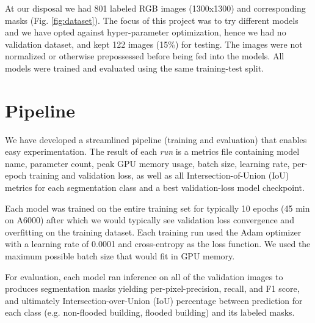 \documentclass[10pt,twocolumn,letterpaper]{article}
\begin{document}
At our disposal we had 801 labeled RGB images (1300x1300) and corresponding masks (Fig. \ref{fig:dataset}). The focus of this project was to try different models and we have opted against hyper-parameter optimization, hence we had no validation dataset, and kept 122 images (15\%) for testing. The images were not normalized or otherwise prepossessed before being fed into the models. All models were trained and evaluated using the same training-test split.



\section{Pipeline}

We have developed a streamlined pipeline (training and evaluation) that enables easy experimentation. The result of each \textit{run} is a metrics file containing model name, parameter count, peak GPU memory usage, batch size, learning rate, per-epoch training and validation loss, as well as all Intersection-of-Union (IoU) metrics for each segmentation class and a best validation-loss model checkpoint.

Each model was trained on the entire training set for typically 10 epochs (45 min on A6000) after which we would typically see validation loss convergence and overfitting on the training dataset. Each training run used the Adam optimizer \cite{kingma2017adam} with a learning rate of 0.0001 and cross-entropy as the loss function. We used the maximum possible batch size that would fit in GPU memory.

For evaluation, each model ran inference on all of the validation images to produces segmentation masks yielding per-pixel-precision, recall, and F1 score, and ultimately Intersection-over-Union (IoU) percentage between prediction for each class (e.g. non-flooded building, flooded building) and its labeled masks. 
\end{document}
